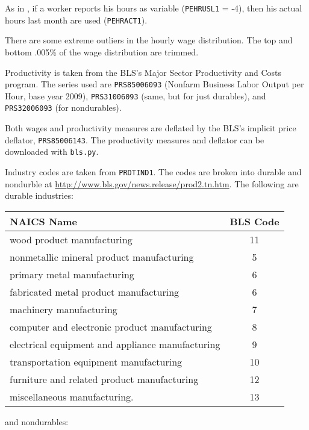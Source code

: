 \documentclass[11pt]{article}
\begin{document}
As in \cite{haefke_sonntag_vanRens_2013}, if a worker reports his hours as variable (\texttt{PEHRUSL1} = -4), then his actual hours last month are used (\texttt{PEHRACT1}).

There are some extreme outliers in the hourly wage distribution.
The top and bottom .005\% of the wage distribution are trimmed.

Productivity is taken from the BLS's Major Sector Productivity and Costs program.
The series used are \texttt{PRS85006093} (Nonfarm Business Labor Output per Hour, base year 2009),
\texttt{PRS31006093} (same, but for just durables), and \texttt{PRS32006093} (for nondurables).

Both wages and productivity measures are deflated by the BLS's implicit price deflator, \texttt{PRS85006143}.
The productivity measures and deflator can be downloaded with \texttt{bls.py}.

Industry codes are taken from \texttt{PRDTIND1}.
The codes are broken into durable and nondurble at \href{http://www.bls.gov/news.release/prod2.tn.htm}{http://www.bls.gov/news.release/prod2.tn.htm}.
The following are durable industries:

\begin{center}
\begin{tabular}{lc} \toprule
NAICS Name                                      & BLS Code \\ \midrule
wood product manufacturing                      & 11       \\
nonmetallic mineral product manufacturing       & 5        \\
primary metal manufacturing                     & 6        \\
fabricated metal product manufacturing          & 6        \\
machinery manufacturing                         & 7        \\
computer and electronic product manufacturing   & 8        \\
electrical equipment and appliance manufacturing& 9        \\
transportation equipment manufacturing          & 10       \\
furniture and related product manufacturing     & 12       \\
miscellaneous manufacturing.                    & 13       \\
\end{tabular}
\end{center}
and nondurables:
\end{document}
